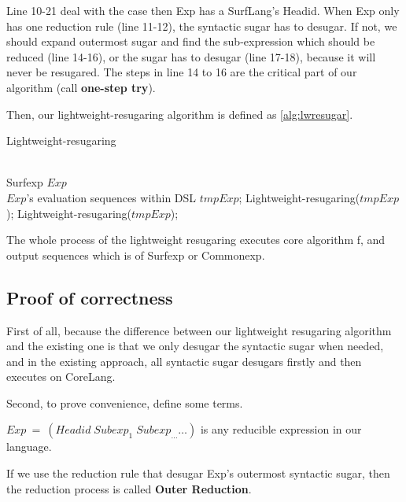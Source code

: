 Line 10-21 deal with the case then Exp has a SurfLang's Headid. When Exp only has one reduction rule (line 11-12), the syntactic sugar has to desugar. If not, we should expand outermost sugar and find the sub-expression which should be reduced (line 14-16), or the sugar has to desugar (line 17-18), because it will never be resugared. The steps in line 14 to 16 are the critical part of our algorithm (call {\bfseries one-step try}\label{mark:onesteptry}).


Then, our lightweight-resugaring algorithm is defined as \ref{alg:lwresugar}.

\begin{algorithm}
	\caption{Lightweight-resugaring}
	\label{alg:lwresugar}     %
	\begin{algorithmic}[1]       %
		\REQUIRE ~~\\      %
		Surfexp $Exp$
		\ENSURE ~~\\     %
		$Exp$'s evaluation sequences within DSL
		\RETURN
		\PRINT $tmpExp$;
		\STATE Lightweight-resugaring($tmpExp$);
		\ELSE
		\STATE Lightweight-resugaring($tmpExp$);
		\ENDIF
		\ENDWHILE

	\end{algorithmic}
\end{algorithm}

The whole process of the lightweight resugaring executes core algorithm f, and output sequences which is of Surfexp or Commonexp.

\subsection{Proof of correctness}

First of all, because the difference between our lightweight resugaring algorithm and the existing one is that we only desugar the syntactic sugar when needed, and in the existing approach, all syntactic sugar desugars firstly and then executes on CoreLang.

Second, to prove convenience, define some terms.

$Exp~=~(Headid\;Subexp_{1}\;Subexp_{\ldots} \ldots)$ is any reducible expression in our language.

If we use the reduction rule that desugar Exp's outermost syntactic sugar, then the reduction process is called {\bfseries Outer Reduction}.

